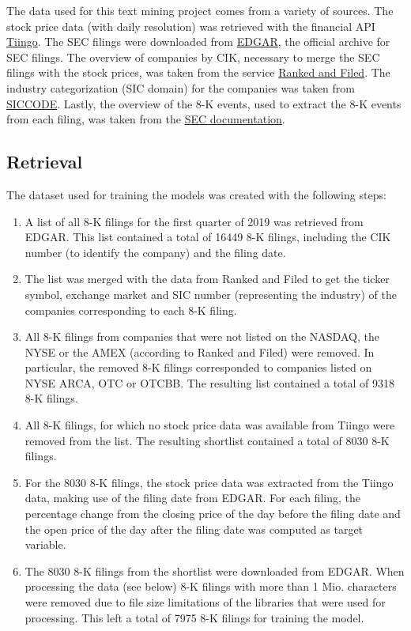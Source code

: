 \documentclass{article}
\begin{document}
	
	The data used for this text mining project comes from a variety of sources. The stock price data (with daily resolution) was retrieved with the financial API \href{https://www.tiingo.com}{Tiingo}. The SEC filings were downloaded from \href{https://www.sec.gov/Archives/edgar/full-index/}{EDGAR}, the official archive for SEC filings. The overview of companies by CIK, necessary to merge the SEC filings with the stock prices, was taken from the service \href{http://rankandfiled.com/#/data/tickers}{Ranked and Filed}. The industry categorization (SIC domain) for the companies was taken from \href{https://siccode.com}{SICCODE}. Lastly, the overview of the 8-K events, used to extract the 8-K events from each filing, was taken from the  \href{https://www.sec.gov/fast-answers/answersform8khtm.html}{SEC documentation}. 
	
	\subsection{Retrieval}
	
	The dataset used for training the models was created with the following steps: 
	
	\begin{enumerate}
		\item A list of all 8-K filings for the first quarter of 2019 was retrieved from EDGAR. This list contained a total of 16449 8-K filings, including the CIK number (to identify the company) and the filing date.
		\item The list was merged with the data from Ranked and Filed to get the ticker symbol, exchange market and SIC number (representing the industry) of the companies corresponding to each 8-K filing.
		\item All  8-K filings from companies that were not listed on the NASDAQ, the NYSE or the AMEX (according to Ranked and Filed) were removed. In particular, the removed 8-K filings corresponded to companies listed on NYSE ARCA, OTC or OTCBB. The resulting list contained a total of 9318 8-K filings.
		\item All 8-K filings, for which no stock price data was available from Tiingo were removed from the list. The resulting shortlist contained a total of 8030 8-K filings. 
		\item For the 8030 8-K filings, the stock price data was extracted from the Tiingo data, making use of the filing date from EDGAR. For each filing, the percentage change from the closing price of the day before the filing date and the open price of the day after the filing date was computed as target variable.
		\item The 8030 8-K filings from the shortlist were downloaded from EDGAR. When processing the data (see below) 8-K filings with more than 1 Mio. characters were removed due to file size limitations of the libraries that were used for processing. This left a total of 7975 8-K filings for training the model.
	\end{enumerate}
	
\end{document}
